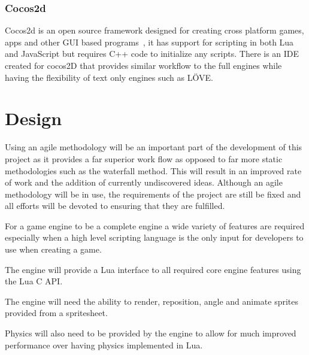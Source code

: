 \documentclass[11pt,a4paper,titlepage]{report}
\begin{document}
\subsection{Cocos2d}
	Cocos2d is an open source framework designed for creating cross platform games, apps and other GUI based programs~\cite{COCOS2D}, it has support for scripting in both Lua and JavaScript but requires C++ code to initialize any scripts. There is an IDE created for cocos2D that provides similar workflow to the full engines while having the flexibility of text only engines such as LÖVE.










\chapter{Design}



	Using an agile methodology will be an important part of the development of this project as it provides a far superior work flow as opposed to far more static methodologies such as the waterfall method. This will result in an improved rate of work and the addition of currently undiscovered ideas. Although an agile methodology will be in use, the requirements of the project are still be fixed and all efforts will be devoted to ensuring that they are fulfilled.


	For a game engine to be a complete engine a wide variety of features are required especially when a high level scripting language is the only input for developers to use when creating a game.

	The engine will provide a Lua interface to all required core engine features using the Lua C API.

	The engine will need the ability to render, reposition, angle and animate sprites provided from a spritesheet.

	Physics will also need to be provided by the engine to allow for much improved performance over having physics implemented in Lua.
\end{document}
